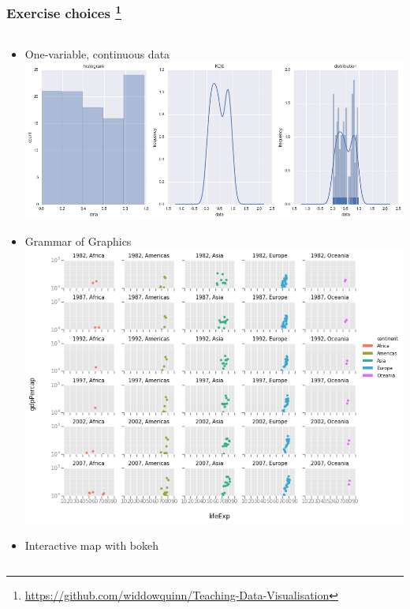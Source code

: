 
\begin{frame}
  \frametitle{Exercise choices
  \footnote{\tiny{\href{https://github.com/widdowquinn/Teaching-Data-Visualisation}{https://github.com/widdowquinn/Teaching-Data-Visualisation}}}
  }
  \begin{scriptsize}
  \begin{columns}[T]
    \begin{column}{5.5cm}  
      \begin{itemize}  
        \item One-variable, continuous data\\
          \includegraphics[height=0.15\textheight]{images/ex1}
        \item Grammar of Graphics\\
          \includegraphics[height=0.15\textheight]{images/ex3}          
        \item Interactive map with bokeh\\

\end{itemize}
\end{column}
\end{columns}
\end{scriptsize}
\end{frame}
